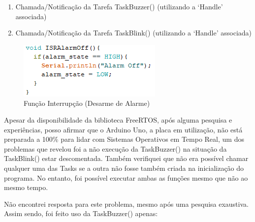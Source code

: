 \begin{enumerate}
    \item Chamada/Notificação da Tarefa TaskBuzzer() (utilizando a `Handle' associada)
    \item Chamada/Notificação da Tarefa TaskBlink() (utilizando a `Handle' associada)
\end{enumerate}

\begin{figure}[H]
    \centering
    \includegraphics{images/codigo/sisBD_off.png}
    \caption{Função Interrupção (Desarme de Alarme)}
    \label{fig:my_label}
\end{figure}

Apesar da disponibilidade da biblioteca FreeRTOS, após alguma pesquisa e experiências, posso afirmar que o Arduino Uno, a placa em utilização, não está preparada a 100\% para lidar com Sistemas Operativos em Tempo Real, um dos problemas que revelou foi a não execução da TaskBuzzer() na situação da TaskBlink() estar descomentada. 
Também verifiquei que não era possível chamar qualquer uma das Tasks se a outra não fosse também criada na inicialização do programa. No entanto, foi possível executar ambas as funções mesmo que não ao mesmo tempo.

Não encontrei resposta para este problema, mesmo após uma pesquisa exaustiva.
\newpage
Assim sendo, foi feito uso da TaskBuzzer() apenas:

